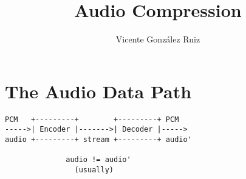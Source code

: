 \title{Audio Compression}
\author{Vicente González Ruiz}
\maketitle
\tableofcontents

\section{The Audio Data Path~\cite{sayood2017introduction}}

\begin{verbatim}
PCM   +---------+        +---------+ PCM
----->| Encoder |------->| Decoder |----->
audio +---------+ stream +---------+ audio'

              audio != audio'
                (usually)
\end{verbatim}

\section{}
\section{}
\section{}



